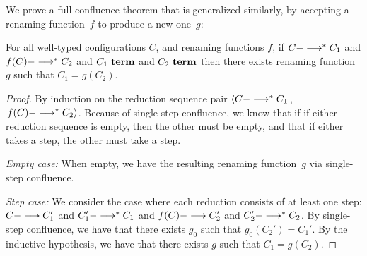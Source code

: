 We prove a full confluence theorem that is generalized similarly, by
accepting a renaming function~$f$ to produce a new one~$g$:

\begin{theorem}
For all well-typed configurations $C$,
and renaming functions $f$,
%
 if $C --->^\ast C_1$ 
and $f(C) --->^\ast C_2$ 
and $C_1~\textbf{term}$
and $C_2~\textbf{term}$
then 
there exists renaming function~$g$ 
such that $C_1 = g(C_2)$.
\begin{proof}
  By induction on the reduction sequence pair
  $\left< C --->^\ast C_1\right.$, 
  $\left.f(C) --->^\ast C_2 \right>$.
  Because of single-step confluence, we know that if
  if either reduction sequence is empty, then the other must be empty,
  and that
  if either takes a step, the other must take a step.
  
  \emph{Empty case:}
  When empty, we have the resulting renaming function~$g$ via single-step confluence.

  \emph{Step case:}
  We consider the case where each reduction consists of at least one step:
  $C ---> C_1'$ and $C_1' --->^\ast C_1$ and
  $f(C) ---> C_2'$ and $C_2' --->^\ast C_2$.
  By single-step confluence, we have that there exists $g_0$ such that $g_0(C_2') = C_1'$.
  By the inductive hypothesis, we have that there exists $g$ such that $C_1 = g(C_2)$.  
\end{proof}
\end{theorem}
